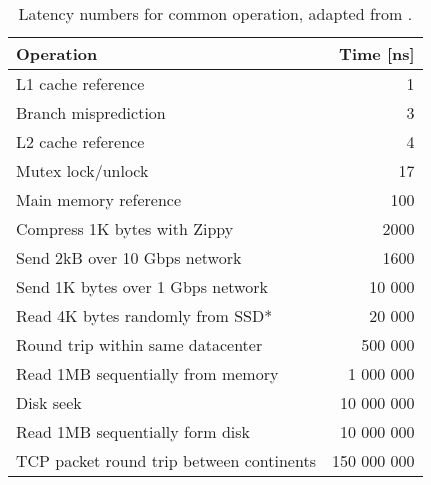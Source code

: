 \begin{table}[H]
    \begin{center}
        \begin{tabular}{|l|r|}
            \hline
            \textbf{Operation}&\textbf{Time [ns]}\\
            \hline
             L1 cache reference&1\\
            \hline
             Branch misprediction&3  \\
            \hline
             L2 cache reference&4  \\
            \hline
             Mutex lock/unlock &17  \\
            \hline
             Main memory reference&100  \\
            \hline
             Compress 1K bytes with Zippy&2000  \\
            \hline
             Send 2kB over 10 Gbps network & 1600\\
            \hline
             Send 1K bytes over 1 Gbps network&10 000  \\
            \hline
             Read 4K bytes randomly from SSD* &20 000  \\
            \hline
             Round trip within same datacenter&500 000  \\
            \hline
             Read 1MB sequentially from memory&1 000 000  \\
            \hline
             Disk seek&10 000 000  \\
            \hline
             Read 1MB sequentially form disk&10 000 000  \\
            \hline
             TCP packet round trip between continents&150 000 000  \\
            \hline
        \end{tabular}
    \end{center}
\caption{Latency numbers for common operation, adapted from \cite{norvig_latency}.}
\label{tab:latencynumbers}
\end{table}
